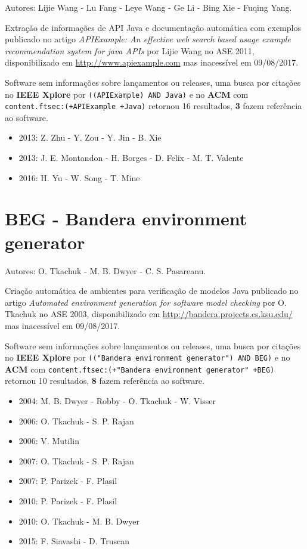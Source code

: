 Autores:
Lijie Wang - Lu Fang - Leye Wang - Ge Li - Bing Xie - Fuqing Yang.

Extração de informações de API Java e documentação automática com exemplos
publicado no artigo {\it APIExample: An effective web search based usage example recommendation system for java APIs}
por Lijie Wang
no ASE 2011,
disponibilizado em \url{http://www.apiexample.com}
mas inacessível em 09/08/2017.

Software sem informações sobre lançamentos ou releases,
uma busca por citações no {\bf IEEE Xplore} por
\texttt{((APIExample) AND Java)}
e no {\bf ACM} com
\texttt{content.ftsec:(+APIExample +Java)}
retornou
16 resultados,
{\bf 3} fazem referência ao software.

\begin{itemize}
\item 2013: Z. Zhu - Y. Zou - Y. Jin - B. Xie
\item 2013: J. E. Montandon - H. Borges - D. Felix - M. T. Valente
\item 2016: H. Yu - W. Song - T. Mine
\end{itemize}

\section{BEG - Bandera environment generator}

Autores:
O. Tkachuk - M. B. Dwyer - C. S. Pasareanu.

Criação automática de ambientes para verificação de modelos Java
publicado no artigo {\it Automated environment generation for software model checking}
por O. Tkachuk
no ASE 2003,
disponibilizado em \url{http://bandera.projects.cs.ksu.edu/}
mas inacessível em 09/08/2017.

Software sem informações sobre lançamentos ou releases,
uma busca por citações no {\bf IEEE Xplore} por
\texttt{(("Bandera environment generator") AND BEG)}
e no {\bf ACM} com
\texttt{content.ftsec:(+"Bandera environment generator" +BEG)}
retornou
10 resultados,
{\bf 8} fazem referência ao software.

\begin{itemize}
\item 2004: M. B. Dwyer - Robby - O. Tkachuk - W. Visser
\item 2006: O. Tkachuk - S. P. Rajan
\item 2006: V. Mutilin
\item 2007: O. Tkachuk - S. P. Rajan
\item 2007: P. Parizek - F. Plasil
\item 2010: P. Parizek - F. Plasil
\item 2010: O. Tkachuk - M. B. Dwyer
\item 2015: F. Siavashi - D. Truscan
\end{itemize}

